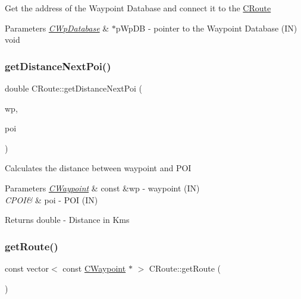 Get the address of the Waypoint Database and connect it to the \hyperlink{classCRoute}{C\+Route} 
\begin{DoxyParams}{Parameters}
{\em \hyperlink{classCWpDatabase}{C\+Wp\+Database}} & $\ast$p\+Wp\+DB -\/ pointer to the Waypoint Database (IN)  void \\
\hline
\end{DoxyParams}
\mbox{\label{classCRoute_ac0eb87d7cce83cee166de71857fa68cb}} 
\subsubsection{\texorpdfstring{get\+Distance\+Next\+Poi()}{getDistanceNextPoi()}}
{\footnotesize\ttfamily double C\+Route\+::get\+Distance\+Next\+Poi (\begin{DoxyParamCaption}\item[{\hyperlink{classCWaypoint}{C\+Waypoint} const \&}]{wp,  }\item[{\hyperlink{classCPOI}{C\+P\+OI} \&}]{poi }\end{DoxyParamCaption})}

Calculates the distance between waypoint and P\+OI 
\begin{DoxyParams}{Parameters}
{\em \hyperlink{classCWaypoint}{C\+Waypoint}} & const \&wp -\/ waypoint (IN) \\
\hline
{\em C\+P\+O\+I\&} & poi -\/ P\+OI (IN) \\
\hline
\end{DoxyParams}
\begin{DoxyReturn}{Returns}
double -\/ Distance in Kms 
\end{DoxyReturn}
\mbox{\label{classCRoute_a4e359e364950dc60f1669ff36761e716}} 
\subsubsection{\texorpdfstring{get\+Route()}{getRoute()}}
{\footnotesize\ttfamily const vector$<$ const \hyperlink{classCWaypoint}{C\+Waypoint} $\ast$ $>$ C\+Route\+::get\+Route (\begin{DoxyParamCaption}{ }\end{DoxyParamCaption})}

